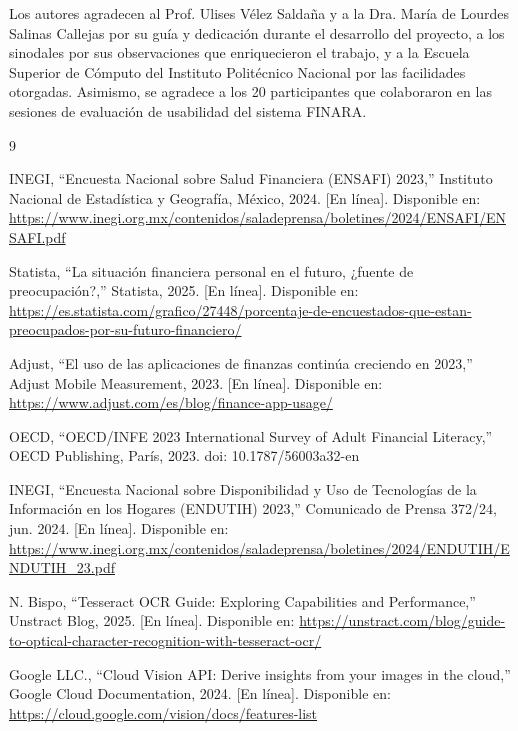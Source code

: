 \documentclass[10pt,twocolumn,letterpaper]{article}
\begin{document}
Los autores agradecen al Prof. Ulises Vélez Saldaña y a la Dra. María de Lourdes Salinas Callejas
por su guía y dedicación durante el desarrollo del proyecto, a los sinodales por sus observaciones
que enriquecieron el trabajo, y a la Escuela Superior de Cómputo del Instituto Politécnico Nacional
por las facilidades otorgadas. Asimismo, se agradece a los 20 participantes que colaboraron en las
sesiones de evaluación de usabilidad del sistema FINARA.


\begingroup
\small
\renewcommand{\refname}{Referencias}
\begin{thebibliography}{9}

INEGI, ``Encuesta Nacional sobre Salud Financiera (ENSAFI) 2023,''
Instituto Nacional de Estadística y Geografía, México, 2024. [En línea].
Disponible en: \url{https://www.inegi.org.mx/contenidos/saladeprensa/boletines/2024/ENSAFI/ENSAFI.pdf}

Statista, ``La situación financiera personal en el futuro, ¿fuente de preocupación?,''
Statista, 2025. [En línea].
Disponible en: \url{https://es.statista.com/grafico/27448/porcentaje-de-encuestados-que-estan-preocupados-por-su-futuro-financiero/}

Adjust, ``El uso de las aplicaciones de finanzas continúa creciendo en 2023,''
Adjust Mobile Measurement, 2023. [En línea].
Disponible en: \url{https://www.adjust.com/es/blog/finance-app-usage/}

OECD, ``OECD/INFE 2023 International Survey of Adult Financial Literacy,''
OECD Publishing, París, 2023.
doi: 10.1787/56003a32-en

INEGI, ``Encuesta Nacional sobre Disponibilidad y Uso de Tecnologías de la Información en los
Hogares (ENDUTIH) 2023,'' Comunicado de Prensa 372/24, jun. 2024. [En línea].
Disponible en: \url{https://www.inegi.org.mx/contenidos/saladeprensa/boletines/2024/ENDUTIH/ENDUTIH_23.pdf}

N. Bispo, ``Tesseract OCR Guide: Exploring Capabilities and Performance,''
Unstract Blog, 2025. [En línea].
Disponible en: \url{https://unstract.com/blog/guide-to-optical-character-recognition-with-tesseract-ocr/}

Google LLC., ``Cloud Vision API: Derive insights from your images in the cloud,''
Google Cloud Documentation, 2024. [En línea].
Disponible en: \url{https://cloud.google.com/vision/docs/features-list}


\end{thebibliography}
\end{document}
